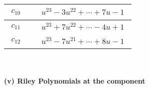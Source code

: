 \documentclass[1p]{elsarticle_modified}
\theoremstyle{definition}
\begin{document}
\begin{tabular}{m{50pt}|m{274pt}}
\hline $$\begin{aligned}c_{10}\end{aligned}$$&$\begin{aligned}
&u^{23}-3 u^{22}+\cdots+7 u-1
\end{aligned}$\\
\hline $$\begin{aligned}c_{11}\end{aligned}$$&$\begin{aligned}
&u^{23}+7 u^{22}+\cdots-4 u+1
\end{aligned}$\\
\hline $$\begin{aligned}c_{12}\end{aligned}$$&$\begin{aligned}
&u^{23}-7 u^{21}+\cdots+8 u-1
\end{aligned}$\\
\hline
\end{tabular}\\~\\
\newpage\renewcommand{\arraystretch}{1}
\flushleft \textbf{(v) Riley Polynomials at the component}\newline \\
\end{document}
